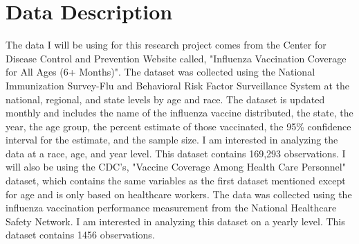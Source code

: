 \documentclass[12pt]{article}
\begin{document}
\section*{Data Description}
\label{sec:data}
The data I will be using for this research project comes from the Center for Disease Control and Prevention Website called, 
"Influenza Vaccination Coverage for All Ages (6+ Months)". The dataset was collected using the National Immunization Survey-Flu and 
Behavioral Risk Factor Surveillance System at the national, regional, and state levels by age and race. The dataset is updated monthly and 
includes the name of the influenza vaccine distributed, the state, the year, the age group, the percent estimate of those vaccinated, 
the 95\% confidence interval for the estimate, and the sample size. I am interested in analyzing the data at a race, age, and year 
level. This dataset contains 169,293 observations. I will also be using the CDC's, "Vaccine Coverage Among Health Care Personnel" dataset, 
which contains the same variables as the first dataset mentioned except for age and is only based on healthcare workers. The data was collected 
using the influenza vaccination performance measurement from the National Healthcare Safety Network. I am interested in analyzing this dataset 
on a yearly level. This dataset contains 1456 observations. 
\end{document}
